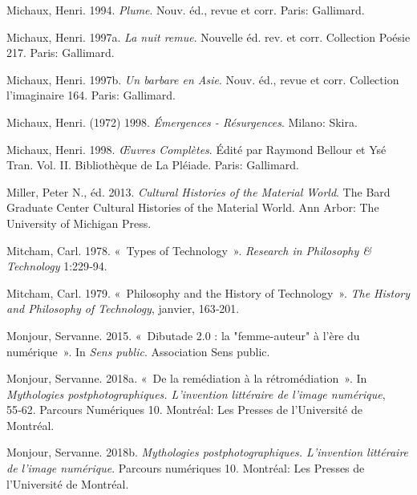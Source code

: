 \begin{CSLReferences}{1}{0}
\leavevmode{}%
Michaux, Henri. 1994. \emph{{Plume}}. Nouv. {é}d., revue et corr.
{Paris}: {Gallimard}.

\leavevmode{}%
Michaux, Henri. 1997a. \emph{{La nuit remue}}. Nouvelle {é}d. rev. et
corr. {Collection Po{é}sie} 217. {Paris}: {Gallimard}.

\leavevmode{}%
Michaux, Henri. 1997b. \emph{{Un barbare en Asie}}. Nouv. {é}d., revue
et corr. {Collection l'imaginaire} 164. {Paris}: {Gallimard}.

\leavevmode{}%
Michaux, Henri. (1972) 1998. \emph{{É}mergences - {R{é}surgences}}.
{Milano}: {Skira}.

\leavevmode{}%
Michaux, Henri. 1998. \emph{{Œ}uvres Compl{è}tes}. Édité par Raymond
Bellour et Ysé Tran. Vol. II. Biblioth{è}que de La {Pl{é}iade}. {Paris}:
{Gallimard}.

\leavevmode{}%
Miller, Peter N., éd. 2013. \emph{Cultural {Histories} of the {Material
World}}. The {Bard Graduate Center Cultural Histories} of the {Material
World}. {Ann Arbor}: {The University of Michigan Press}.

\leavevmode{}%
Mitcham, Carl. 1978. {«~Types of {Technology}~»}. \emph{Research in
Philosophy \& Technology} 1:229‑94.

\leavevmode{}%
Mitcham, Carl. 1979. {«~Philosophy and the {History} of {Technology}~»}.
\emph{The History and Philosophy of Technology}, janvier, 163‑201.

\leavevmode{}%
Monjour, Servanne. 2015. {«~{Dibutade 2.0 : la "femme-auteur" {à}
l'{è}re du num{é}rique}~»}. In \emph{{Sens public}}. {Association Sens
public}.

\leavevmode{}%
Monjour, Servanne. 2018a. {«~{De la rem{é}diation {à} la
r{é}trom{é}diation}~»}. In \emph{{Mythologies postphotographiques.
L'invention litt{é}raire de l'image num{é}rique}}, 55‑62. {Parcours
Num{é}riques} 10. {Montr{é}al}: {Les Presses de l'Universit{é} de
Montr{é}al}.

\leavevmode{}%
Monjour, Servanne. 2018b. \emph{{Mythologies postphotographiques.
L'invention litt{é}raire de l'image num{é}rique}}. {Parcours
num{é}riques} 10. {Montr{é}al}: {Les Presses de l'Universit{é} de
Montr{é}al}.


\end{CSLReferences}
